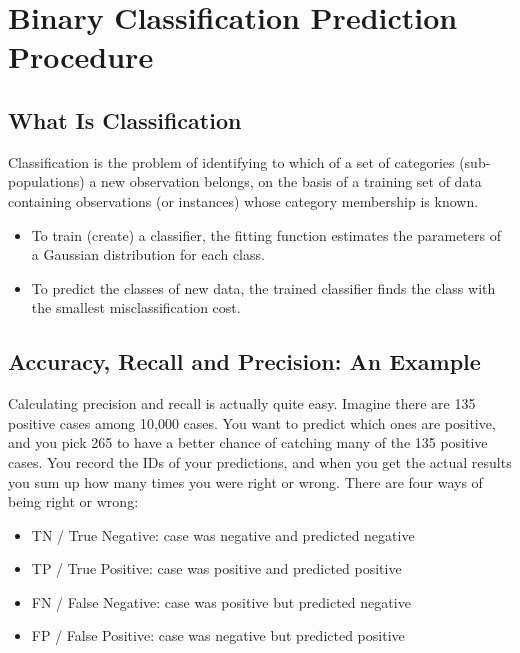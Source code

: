 \documentclass[a4paper,12pt]{article}
\begin{document}
	
	

	\section{Binary Classification Prediction Procedure} 

	\subsection*{What Is Classification}
	Classification is the problem of identifying to which of a set of categories
	(sub-populations) a new observation belongs, on the basis of a training set
	of data containing observations (or instances) whose category membership is
	known. 
	
	\begin{itemize}
		\item  To train (create) a classifier, the fitting function estimates the parameters
		of a Gaussian distribution for each class.
		\item  To predict the classes of new data, the trained classifier finds the class
		with the smallest misclassification cost.
	\end{itemize}


\subsection{Accuracy, Recall and Precision: An Example}
Calculating precision and recall is actually quite easy. Imagine there are 135 positive cases among 10,000 cases. You want to predict which ones are positive, and you pick 265 to have a better chance of catching many of the 135 positive cases.  You record the IDs of your predictions, and when you get the actual results you sum up how many times you were right or wrong. There are four ways of being right or wrong:

\begin{itemize}
\item TN / True Negative: case was negative and predicted negative
\item TP / True Positive: case was positive and predicted positive
\item FN / False Negative: case was positive but predicted negative
\item FP / False Positive: case was negative but predicted positive
\end{itemize}
\end{document}
